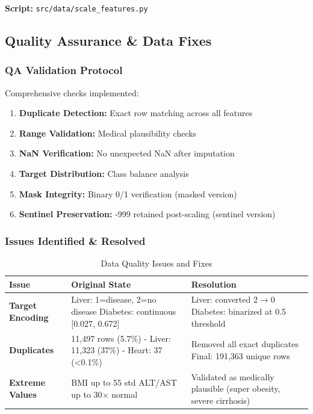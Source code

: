 \documentclass[12pt,a4paper]{article}
\begin{document}
\textbf{Script:} \texttt{src/data/scale\_features.py}

\subsection{Quality Assurance \& Data Fixes}

\subsubsection{QA Validation Protocol}

Comprehensive checks implemented:

\begin{enumerate}
    \item \textbf{Duplicate Detection:} Exact row matching across all features
    \item \textbf{Range Validation:} Medical plausibility checks
    \item \textbf{NaN Verification:} No unexpected NaN after imputation
    \item \textbf{Target Distribution:} Class balance analysis
    \item \textbf{Mask Integrity:} Binary 0/1 verification (masked version)
    \item \textbf{Sentinel Preservation:} -999 retained post-scaling (sentinel version)
\end{enumerate}

\subsubsection{Issues Identified \& Resolved}

\begin{table}[H]
\centering
\caption{Data Quality Issues and Fixes}
\begin{tabular}{p{4cm}p{4cm}p{5cm}}
\toprule
\textbf{Issue} & \textbf{Original State} & \textbf{Resolution} \\
\midrule
\textbf{Target Encoding} & 
Liver: 1=disease, 2=no disease \newline
Diabetes: continuous [0.027, 0.672] & 
Liver: converted 2$\rightarrow$0 \newline
Diabetes: binarized at 0.5 threshold \\
\midrule
\textbf{Duplicates} & 
11,497 rows (5.7\%) \newline
- Liver: 11,323 (37\%) \newline
- Heart: 37 (<0.1\%) & 
Removed all exact duplicates \newline
Final: 191,363 unique rows \\
\midrule
\textbf{Extreme Values} & 
BMI up to 55 std \newline
ALT/AST up to 30$\times$ normal & 
Validated as medically plausible \newline
(super obesity, severe cirrhosis) \\
\bottomrule
\end{tabular}
\end{table}
\end{document}
